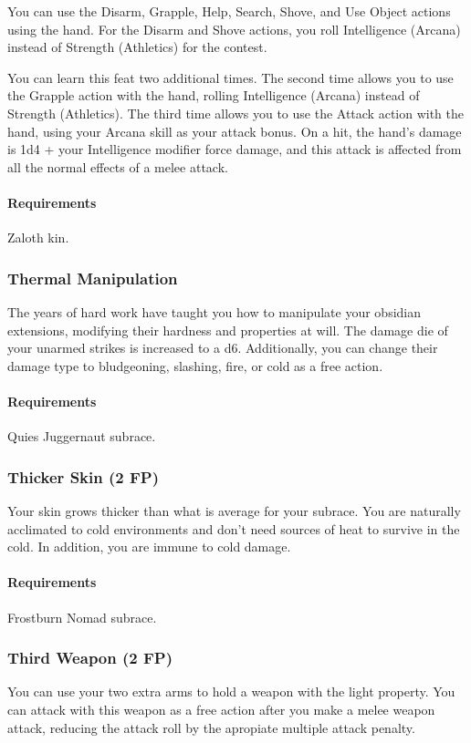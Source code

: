     You can use the Disarm, Grapple, Help, Search, Shove, and Use Object actions using the hand.
    For the Disarm and Shove actions, you roll Intelligence (Arcana) instead of Strength (Athletics) for the contest.

    You can learn this feat two additional times.
    The second time allows you to use the Grapple action with the hand, rolling Intelligence (Arcana) instead of Strength (Athletics).
    The third time allows you to use the Attack action with the hand, using your Arcana skill as your attack bonus.
    On a hit, the hand's damage is 1d4 + your Intelligence modifier force damage, and this attack is affected from all the normal effects of a melee attack.
    \paragraph{Requirements} Zaloth kin.
\subsubsection{Thermal Manipulation} \label{feat::thermalmanipulation}
    The years of hard work have taught you how to manipulate your obsidian extensions, modifying their hardness and properties at will.
    The damage die of your unarmed strikes is increased to a d6.
    Additionally, you can change their damage type to bludgeoning, slashing, fire, or cold as a free action.
    \paragraph{Requirements} Quies Juggernaut subrace.
\subsubsection{Thicker Skin (2 FP)} \label{feat::thickerskin}
    Your skin grows thicker than what is average for your subrace.
    You are naturally acclimated to cold environments and don't need sources of heat to survive in the cold.
    In addition, you are immune to cold damage.

    \paragraph{Requirements} Frostburn Nomad subrace.
\subsubsection{Third Weapon (2 FP)} \label{feat::thirdweapon}
    You can use your two extra arms to hold a weapon with the light property.
    You can attack with this weapon as a free action after you make a melee weapon attack, reducing the attack roll by the apropiate multiple attack penalty.
